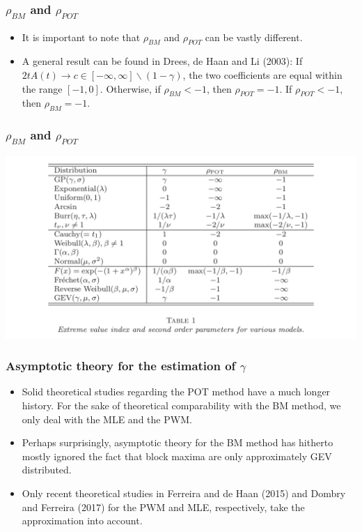 \documentclass{beamer}
\begin{document}
\begin{frame}
    \frametitle{$\rho_{BM}$ and $\rho_{POT}$}
    \begin{itemize}
        \item It is important to note that $\rho_{BM}$ and $\rho_{POT}$ can be vastly different. 
        \item A general result can be found in Drees, de Haan and Li (2003): If $2tA(t)\to c \in [-\infty,\infty]\backslash(1-\gamma)$, the two coefficients are equal within the range $[-1,0]$. Otherwise, if $\rho_{BM}<-1$, then $\rho_{POT}=-1$. If $\rho_{POT}<-1$, then $\rho_{BM}=-1$.
    \end{itemize}
    

    

\end{frame}

\begin{frame}
    \frametitle{$\rho_{BM}$ and $\rho_{POT}$}

    \includegraphics[width=1\textwidth]{fig1.png}

\end{frame}

\begin{frame}
    \frametitle{Asymptotic theory for the estimation of $\gamma$}
\begin{itemize}
    \item Solid theoretical studies regarding the POT method have a much longer history. For the sake of theoretical comparability with the BM
    method, we only deal with the MLE and the PWM.
    \item Perhaps surprisingly, asymptotic theory for the BM method has hitherto mostly ignored the fact that
    block maxima are only {\color{red} approximately} GEV distributed.
    \item Only recent theoretical studies in Ferreira and de Haan (2015) and Dombry and Ferreira (2017) for the PWM and MLE, respectively,
    take the approximation into account.
\end{itemize}
\end{frame}
\end{document}

